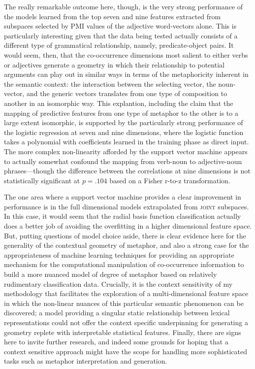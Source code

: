 The really remarkable outcome here, though, is the very strong performance of the models learned from the top seven and nine features extracted from subspaces selected by PMI values of the adjective word-vectors alone.  This is particularly interesting given that the data being tested actually consists of a different type of grammatical relationship, namely, predicate-object pairs.  It would seem, then, that the co-occurrence dimensions most salient to either verbs or adjectives generate a geometry in which their relationship to potential arguments can play out in similar ways in terms of the metaphoricity inherent in the semantic context: the interaction between the selecting vector, the noun-vector, and the generic vectors translates from one type of composition to another in an isomorphic way.  This explantion, including the claim that the mapping of predictive features from one type of metaphor to the other is to a large extent isomorphic, is supported by the particularly strong performance of the logistic regression at seven and nine dimensions, where the logistic function takes a polynomial with coefficients learned in the training phase as direct input.  The more complex non-linearity afforded by the support vector machine appears to actually somewhat confound the mapping from verb-noun to adjective-noun phrases---though the difference between the correlations at nine dimensions is not statistically significant at $p = .104$ based on a Fisher r-to-z transformation.

The one area where a support vector machine provides a clear improvement in performance is in the full dimensional models extrapolated from \textsc{joint} subspaces.  In this case, it would seem that the radial basis function classification actually does a better job of avoiding the overfitting in a higher dimensional feature space.  But, putting questions of model choice aside, there is clear evidence here for the generality of the contextual geometry of metaphor, and also a strong case for the appropriateness of machine learning techniques for providing an appropriate mechanism for the computational manipulation of co-occurrence information to build a more nuanced model of degree of metaphor based on relatively rudimentary classification data.  Crucially, it is the context sensitivity of my methodology that facilitates the exploration of a multi-dimensional feature space in which the non-linear nuances of this particular semantic phenomenon can be discovered; a model providing a singular static relationship between lexical representations could not offer the context specific underpinning for generating a geometry replete with interpretable statistical features.  Finally, there are signs here to invite further research, and indeed some grounds for hoping that a context sensitive approach might have the scope for handling more sophisticated tasks such as metaphor interpretation and generation.


